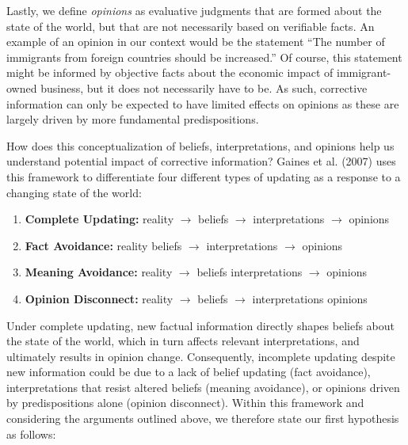 \documentclass[
  12pt,
]{article}
\providecommand{\tightlist}{%
  \setlength{\itemsep}{0pt}\setlength{\parskip}{0pt}}
\begin{document}
Lastly, we define \emph{opinions} as evaluative judgments that are
formed about the state of the world, but that are not necessarily based
on verifiable facts. An example of an opinion in our context would be
the statement ``The number of immigrants from foreign countries should
be increased.'' Of course, this statement might be informed by objective
facts about the economic impact of immigrant-owned business, but it does
not necessarily have to be. As such, corrective information can only be
expected to have limited effects on opinions as these are largely driven
by more fundamental predispositions.

How does this conceptualization of beliefs, interpretations, and
opinions help us understand potential impact of corrective information?
Gaines et al. (2007) uses this framework to differentiate four different
types of updating as a response to a changing state of the world:

\singlespace

\begin{enumerate}
\def\labelenumi{\arabic{enumi}.}
\tightlist
\item
  \textbf{Complete Updating:} \hspace{0.5em} reality \(\rightarrow\)
  beliefs \(\rightarrow\) interpretations \(\rightarrow\) opinions
\item
  \textbf{Fact Avoidance:} \hspace{2.4em} reality \textbf{\textbar{}
  \textbar{}} beliefs \(\rightarrow\) interpretations \(\rightarrow\)
  opinions
\item
  \textbf{Meaning Avoidance:} \hspace{0.4em} reality \(\rightarrow\)
  beliefs \textbf{\textbar{} \textbar{}} interpretations \(\rightarrow\)
  opinions
\item
  \textbf{Opinion Disconnect:} \hspace{0.4em} reality \(\rightarrow\)
  beliefs \(\rightarrow\) interpretations \textbf{\textbar{} \textbar{}}
  opinions
\end{enumerate}

\vspace{1em}\doublespace

\noindent Under complete updating, new factual information directly
shapes beliefs about the state of the world, which in turn affects
relevant interpretations, and ultimately results in opinion change.
Consequently, incomplete updating despite new information could be due
to a lack of belief updating (fact avoidance), interpretations that
resist altered beliefs (meaning avoidance), or opinions driven by
predispositions alone (opinion disconnect). Within this framework and
considering the arguments outlined above, we therefore state our first
hypothesis as follows:
\end{document}
